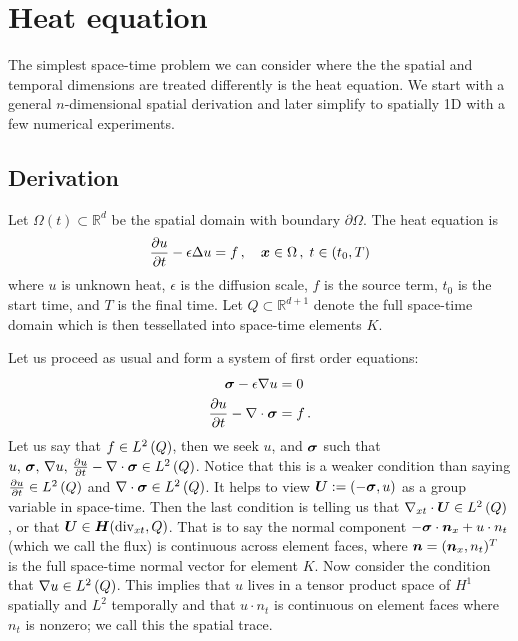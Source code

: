 \documentclass[Proposal.tex]{subfiles}
\begin{document}
%                                          
%                                          
%  
\section{Heat equation}
The simplest space-time problem we can consider where the the spatial and temporal dimensions are treated differently is the heat equation.
We start with a general $n$-dimensional spatial derivation and later simplify to spatially 1D with a few numerical experiments.

\subsection{Derivation}
Let $\Omega(t)\subset\mathbb{R}^d$ be the spatial domain with boundary $\partial\Omega$.
The heat equation is
\begin{equation}
	\frac{\partial u}{\partial t}-\epsilon\Delta u=f\,,\quad\boldsymbol x\in\Omega\,,\;t\in(t_0,T)
\end{equation}
where $u$ is unknown heat, $\epsilon$ is the diffusion scale, $f$ is the source term, $t_0$ is the start time, and $T$ is the final time.
Let $Q\subset\mathbb{R}^{d+1}$ denote the full space-time domain which is then tessellated into space-time elements $K$.

Let us proceed as usual and form a system of first order equations:
\begin{equation}
\label{eq:heatFirstOrder}
\begin{aligned}
\boldsymbol\sigma-\epsilon\nabla u&=0\\
\frac{\partial u}{\partial t}-\nabla\cdot\boldsymbol\sigma&=f\,.
\end{aligned}
\end{equation}
Let us say that $f\in L^2\left( Q \right)$, then we seek $u$, and $\boldsymbol\sigma$ such that $u,\,\boldsymbol\sigma,\,\nabla u,\,\frac{\partial u}{\partial t}-\nabla\cdot\boldsymbol\sigma\in L^2\left( Q \right)$.
Notice that this is a weaker condition than saying $\frac{\partial u}{\partial t}\in L^2\left( Q \right)$ and $\nabla\cdot\boldsymbol\sigma\in L^2\left( Q \right)$.
It helps to view $\boldsymbol U:=(-\boldsymbol\sigma, u)$ as a group variable in space-time. 
Then the last condition is telling us that $\nabla_{xt}\cdot\boldsymbol U\in L^2\left( Q \right)$, or that $\boldsymbol U\in\mbox{\boldmath $H$}(\text{div}_{xt},Q)$.
That is to say the normal component $-\boldsymbol\sigma\cdot\boldsymbol n_x+u\cdot n_t$ (which we call the flux) is continuous across element faces, 
where $\boldsymbol n=(\boldsymbol n_x,n_t)^T$ is the full space-time normal vector for element $K$.
Now consider the condition that $\nabla u\in L^2\left( Q \right)$.
This implies that $u$ lives in a tensor product space of $H^1$ spatially and $L^2$ temporally and that
$u\cdot n_t$ is continuous on element faces where $n_t$ is nonzero; we call this the spatial trace.
\end{document}
